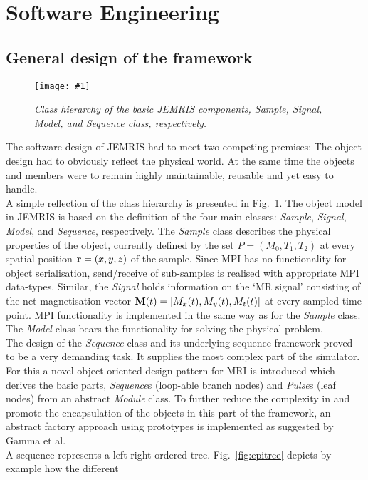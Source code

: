 \documentclass{nic-series}
\newcommand{\epsfigure}[5]{
 \begin{figure}[#4!]
   \begin{center}
    \texttt{[image: \#1]}
    \caption{{\sl #2}\label{#3}}
   \end{center}
 \end{figure}}
\begin{document}
\section{Software Engineering}
\subsection{General design of the framework}
\epsfigure{fig/jemris-classes.eps}{Class hierarchy of the basic JEMRIS components, Sample, Signal, Model, and Sequence class,
                            respectively.}{fig:classes}{bp}{1.0}
The software design of JEMRIS had to meet two competing
premises: The object design had to obviously reflect the physical
world. At the same time the objects and members were to remain highly
maintainable, reusable and yet easy to handle.
\\
A simple reflection of the class hierarchy is presented in
Fig.~\ref{fig:classes}. The object
model in JEMRIS is based on the definition of the four main
classes: {\it Sample}, {\it Signal}, {\it Model}, and {\it Sequence},
respectively. The {\it Sample} class describes the physical properties
of the object, currently defined by the set $P=(M_0,T_1,T_2)$ at every
spatial position ${\bf r}=(x,y,z)$ of the sample. Since MPI has no
functionality for object serialisation, send/receive of sub-samples is
realised with appropriate MPI data-types. Similar, the {\it Signal}
holds information on the `MR signal' consisting of the net
magnetisation vector ${\bf M}(t)=[M_x(t),M_y(t),M_t(t)]$ at every
sampled time point. MPI functionality is implemented in the same way
as for the {\it Sample} class. The {\it Model} class bears the
functionality for solving the physical problem. 
\\
The design of the {\it Sequence} class and its underlying
sequence framework proved to be a very demanding task. It supplies
the most complex part of the simulator. For this a novel object
oriented design pattern for MRI is introduced which derives the basic
parts, {\it Sequence}s (loop-able branch nodes) and {\it Pulse}s (leaf
nodes) from an abstract {\it Module} class. To further reduce the complexity in and
promote the encapsulation of the objects in this part of the framework,
an abstract factory approach using prototypes is implemented as suggested by
Gamma et al\cite{gamma}. 
\\
A sequence represents a left-right ordered tree. Fig.~\ref{fig:epitree} depicts by example how the different
\end{document}
